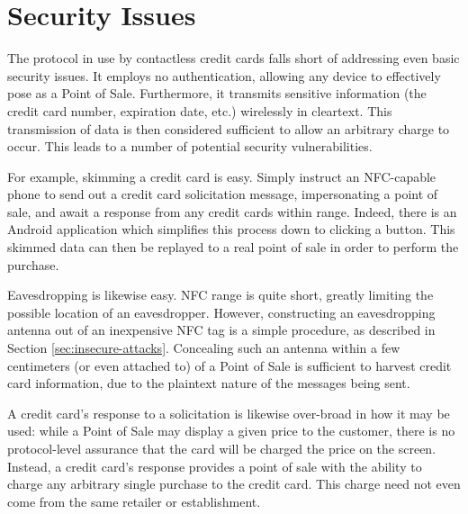 \section{Security Issues}
\label{sec:intro-problem}

The protocol in use by contactless credit cards falls short of addressing even basic security issues.
It employs no authentication, allowing any device to effectively pose as a Point of Sale.
Furthermore, it transmits sensitive information (the credit card number, expiration date, etc.) wirelessly in cleartext.
This transmission of data is then considered sufficient to allow an arbitrary charge to occur.
This leads to a number of potential security vulnerabilities.

For example, skimming a credit card is easy.
Simply instruct an NFC-capable phone to send out a credit card solicitation message, impersonating a point of sale, and await a response from any credit cards within range.
Indeed, there is an Android application \cite{NFCProxy} which simplifies this process down to clicking a button.
This skimmed data can then be replayed to a real point of sale in order to perform the purchase.

Eavesdropping is likewise easy.
NFC range is quite short, greatly limiting the possible location of an eavesdropper.
However, constructing an eavesdropping antenna out of an inexpensive NFC tag is a simple procedure, as described in Section \ref{sec:insecure-attacks}.
Concealing such an antenna within a few centimeters (or even attached to) of a Point of Sale is sufficient to harvest credit card information,
    due to the plaintext nature of the messages being sent.

A credit card's response to a solicitation is likewise over-broad in how it may be used:
    while a Point of Sale may display a given price to the customer, there is no protocol-level assurance that the card will be charged the price on the screen.
Instead, a credit card's response provides a point of sale with the ability to charge any arbitrary single purchase to the credit card.
This charge need not even come from the same retailer or establishment.
